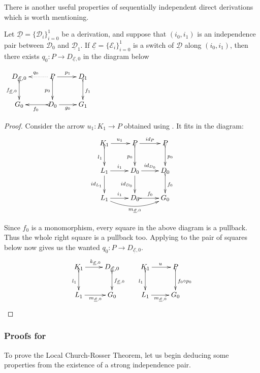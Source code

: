 \documentclass[a4paper,UKenglish,cleveref,pdftex,thm-restate,numberwithinsect,anonymous]{lipics}
\newcommand{\id}[1]{\mathsf{id}_{#1}}
\newcommand{\dder}[1]{\mathscr{#1}}
\newcommand{\der}[1]{\underline{\dder{#1}}}
\begin{document}
There is another
useful properties of  sequentially independent direct
derivations which is worth mentioning.

\noindent
\parbox{9.5cm}
{\begin{proposition}\label{lem:cose}Let
    $\der{D}=\{\dder{D}_i\}_{i=0}^1$ be a derivation, and suppose
    that $(i_0, i_1)$ is an independence pair between $\dder{D}_0$
    and $\der{D}_1$.  If $\der{E}=\{\dder{E}_i\}_{i=0}^1$ is a
    switch of $\der{D}$ along $(i_0, i_1)$, then there exists
    $q_0\colon P\to D_{\der{E},0}$ in the diagram
    below \end{proposition}}
\parbox{4cm}{$\xymatrix{D_{\der{E},0} \ar@{>->}[d]_{f_{\der{E},0}}&P
    \ar@{.>}[l]_{q_0} \ar[r]^{p_1} \ar@{>->}[d]_{p_0}& D_1
    \ar@{>->}[d]^{f_1}\\ G_{0}&D_0 \ar@{>->}[l]^{f_0}\ar[r]_{g_0}&
    G_1}$}

\begin{proof}
  Consider the arrow $u_1\colon K_1\to P$ obtained using
  . It fits in the diagram:
\[		\xymatrix{K_1 \ar[r]^{u_1} \ar@{>->}[d]_{l_1}&P
	\ar[r]^{\id{P}}\ar@{>->}[d]_{p_0}& P\ar@{>->}[d]^{p_0}\\L_1
	\ar[d]_{\id{L_1}}\ar[r]^{i_1}&D_0 \ar[r]^{\id{D_0}}
	\ar[d]_{\id{D_0}}& D_{0} \ar@{>->}[d]^{f_0}\\
	L_1\ar[r]^{i_1} \ar@/_.4cm/[rr]_{m_{\der{E},0}}&D_0
	\ar@{>->}[r]^{f_0}&G_0}\]

  Since $f_0$ is a monomorphism, every square in the above diagram
  is a pullback. Thus the whole right square is a pullback too.
  Applying  to the pair of squares below now gives
  us the wanted $q_0\colon P\to D_{\der{E},0}$.
  \[	\xymatrix{K_1 \ar@{>->}[d]_{l_1}\ar[r]^{k_{\der{E},0}}&
  	D_{\der{E},0} \ar@{>->}[d]^{f_{\der{E},0}} & K_1 \ar[r]^{u}
  	\ar@{>->}[d]_{l_1}& P \ar@{>->}[d]^{f_0\circ
  		p_0}\\L_1\ar[r]_{m_{\der{E},0}}&G_0 &L_1
  	\ar[r]_{m_{\der{E},0}}&G_0} \]
\end{proof}


\subsubsection{Proofs for }

To prove the Local Church-Rosser Theorem, let us begin deducing some properties from the existence of a strong independence pair. 
\end{document}
